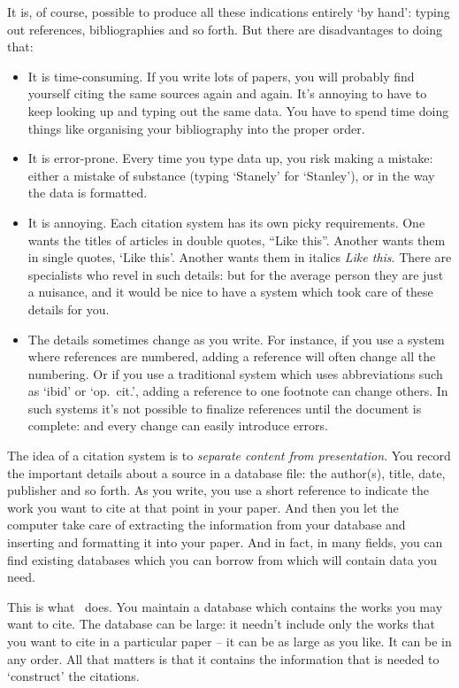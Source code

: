 It is, of course, possible to produce all these indications entirely `by hand': typing out references, bibliographies and so forth. But there are disadvantages to doing that:
\begin{itemize}
\item It is time-consuming. If you write lots of papers, you will probably find yourself citing the same sources again and again. It's annoying to have to keep looking up and typing out the same data. You have to spend time doing things like organising your bibliography into the proper order.
\item It is error-prone. Every time you type data up, you risk making a mistake: either a mistake of substance (typing `Stanely' for `Stanley'), or in the way the data is formatted.
\item It is annoying. Each citation system has its own picky requirements. One wants the titles of articles in double quotes, ``Like this''. Another wants them in single quotes, `Like this'. Another wants them in italics \emph{Like this}. There are specialists who revel in such details: but for the average person they are just a nuisance, and it would be nice to have a system which took care of these details for you.
\item The details sometimes change as you write. For instance, if you use a system where references are numbered, adding a reference will often change all the numbering. Or if you use a traditional system which uses abbreviations such as `ibid' or `op.\ cit.', adding a reference to one footnote can change others. In such systems it's not possible to finalize references until the document is complete: and every change can easily introduce errors.
\end{itemize}

The idea of a citation system is to \emph{separate content from presentation}. You record the important details about a source in a database file: the author(s), title, date, publisher and so forth. As you write, you use a short reference to indicate the work you want to cite at that point in your paper. And then you let the computer take care of extracting the information from your database and inserting and formatting it into your paper. And in fact, in many fields, you can find existing databases which you can borrow from which will contain data you need.

This is what \biblatex\ does. You maintain a database which contains the works you may want to cite. The database can be large: it needn't include only the works that you want to cite in a particular paper -- it can be as large as you like. It can be in any order. All that matters is that it contains the information that is needed to `construct' the citations.

